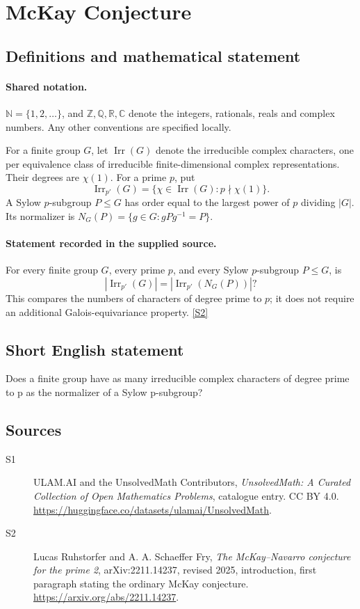 \documentclass[11pt]{article}
\newcommand{\sref}[2]{\hyperlink{source:#1:#2}{[S#2]}}
\begin{document}
\section{McKay Conjecture}\label{statement}

\subsection{Definitions and mathematical statement}

\paragraph{Shared notation.}$\mathbb N=\{1,2,\ldots\}$, and $\mathbb Z,\mathbb Q,\mathbb R,\mathbb C$ denote the integers, rationals, reals and complex numbers. Any other conventions are specified locally.


For a finite group \(G\), let \(\operatorname{Irr}(G)\) denote the
irreducible complex characters, one per equivalence class of irreducible
finite-dimensional complex representations.  Their degrees are
\(\chi(1)\).  For a prime \(p\), put
\[
 \operatorname{Irr}_{p'}(G)
  =\{\chi\in\operatorname{Irr}(G):p\nmid\chi(1)\}.
\]
A Sylow \(p\)-subgroup \(P\le G\) has order equal to the largest power
of \(p\) dividing \(|G|\).  Its normalizer is
\(N_G(P)=\{g\in G:gPg^{-1}=P\}\).
\paragraph{Statement recorded in the supplied source.}
For every finite group \(G\), every prime \(p\), and every Sylow
\(p\)-subgroup \(P\le G\), is
\[
 |\operatorname{Irr}_{p'}(G)|
   =|\operatorname{Irr}_{p'}(N_G(P))|?
\]
This compares the numbers of characters of degree prime to \(p\);
it does not require an additional Galois-equivariance property. \sref{statement}{2}
\subsection{Short English statement}
Does a finite group have as many irreducible complex characters of degree prime to p as the normalizer of a Sylow p-subgroup?
\subsection{Sources}
\begin{description}
\item[\hypertarget{source:statement:1}{S1}] ULAM.AI and the UnsolvedMath Contributors, \emph{UnsolvedMath: A Curated Collection of Open Mathematics Problems}, catalogue entry. CC BY 4.0. \url{https://huggingface.co/datasets/ulamai/UnsolvedMath}.
\item[\hypertarget{source:statement:2}{S2}] Lucas Ruhstorfer and A. A. Schaeffer Fry, \emph{The McKay--Navarro conjecture for the prime 2}, arXiv:2211.14237, revised 2025, introduction, first paragraph stating the ordinary McKay conjecture. \url{https://arxiv.org/abs/2211.14237}.
\end{description}
\label{end:statement}
\end{document}
